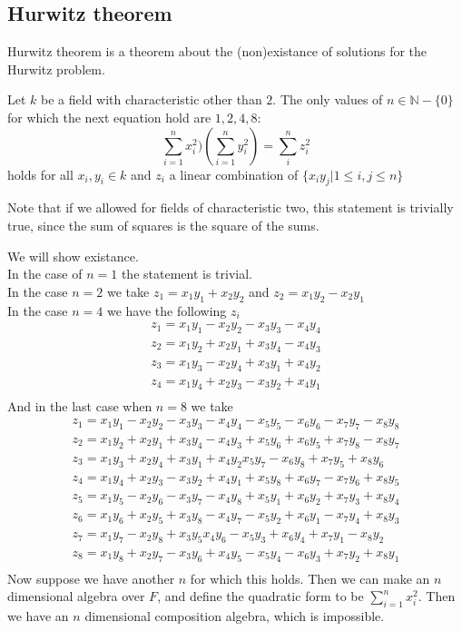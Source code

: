 \documentclass[../Thesis.tex]{subfiles}
\begin{document}
\subsection{Hurwitz theorem}
Hurwitz theorem is a theorem about the (non)existance of solutions for the Hurwitz problem.
\begin{theorem}
Let $k$ be a field with characteristic other than $2$. The only values of $n \in \mathbb{N}-\{0\}$ for which the next equation hold are $1,2,4,8$:
\begin{equation}
\sum_{i = 1}^nx^2_i)(\sum_{i=1}^ny_i^2) = \sum_i^n z_i^2
\end{equation}
holds for all $x_i, y_i \in k$ and $z_i$ a linear combination of $\{x_iy_j|1 \leq i,j \leq n \}$
\end{theorem}
Note that if we allowed for fields of characteristic two, this statement is trivially true, since the sum of squares is the square of the sums.
\begin{myproof}
We will show existance. 
\\In the case of $n = 1$ the statement is trivial. 
\\In the case $n = 2$ we take $z_1 = x_1y_1 + x_2 y_2$ and $z_2 = x_1y_2-x_2y_1$
\\In the case $n = 4$ we have the following $z_i$
\begin{eqnarray}
z_1 = x_1y_1 - x_2y_2 - x_3y_3 - x_4y_4\\
z_2 = x_1y_2 + x_2y_1 + x_3y_4 - x_4y_3\\
z_3 = x_1y_3 - x_2y_4 + x_3y_1 + x_4y_2\\
z_4 = x_1y_4 + x_2y_3 - x_3y_2 + x_4y_1\\
\end{eqnarray}
And in the last case when $n = 8$ we take
\begin{eqnarray}
z_1 = x_1y_1 - x_2 y_2 - x_3y_3 - x_4y_4 - x_5y_5 - x_6y_6 - x_7y_7 - x_8y_8\\
z_2 = x_1y_2 + x_2y_1 + x_3y_4 - x_4y_3 + x_5y_6 + x_6y_5 + x_7y_8 - x_8y_7\\
z_3 = x_1y_3 + x_2 y_4 + x_3y_1 + x_4y_2 x_5y_7 - x_6y_8 + x_7y_5 + x_8y_6\\
z_4 = x_1y_4 + x_2y_3 - x_3y_2 + x_4y_1 + x_5y_8 + x_6y_7 - x_7y_6 + x_8y_5\\
z_5 = x_1y_5 - x_2y_6 - x_3y_7 - x_4y_8 + x_5y_1 + x_6y_2 + x_7y_3 + x_8y_4\\
z_6 = x_1y_6 + x_2y_5 + x_3y_8 - x_4y_7 - x_5y_2 + x_6y_1 - x_7y_4 + x_8y_3\\
z_7 = x_1y_7 -x_2y_8 + x_3y_5 x_4y_6 - x_5y_3 + x_6y_4 + x_7y_1 - x_8y_2\\
z_8 = x_1y_8 + x_2y_7 - x_3y_6 + x_4y_5 - x_5y_4 - x_6y_3 + x_7y_2 + x_8y_1\\
\end{eqnarray}
Now suppose we have another $n$ for which this holds. Then we can make an $n$ dimensional algebra over $F$, and define the quadratic form to be $\sum_{i = 1}^ n x_i^2$. Then we have an $n$ dimensional composition algebra, which is impossible.
\end{myproof}
\end{document}
